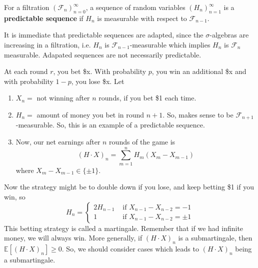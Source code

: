 	\begin{definition}
		For a filtration $(\mathscr{F}_n)_{n=0}^\infty$, a sequence of random variables $(H_n)_{n=1}^\infty$ is a \textbf{predictable sequence} if $H_n$ is measurable with respect to $\mathscr{F}_{n-1}$. 
	\end{definition}

	It is immediate that predictable sequences are adapted, since the $\sigma$-algebras are increasing in a filtration, i.e. $H_n$ is $\mathscr{F}_{n-1}$-measurable which implies $H_n$ is $\mathscr{F}_n$ measurable. Adapated sequences are not necessarily predictable. 

	\begin{example}[Gambling]
	  At each round $r$, you bet \$x. With probability $p$, you win an additional \$x and with probability $1-p$, you lose \$x. Let 
		\begin{enumerate}
		  \item $X_n = $ not winning after $n$ rounds, if you bet \$1 each time. 
			\item $H_n = $ amount of money you bet in round $n+1$. So, makes sense to be $\mathscr{F}_{n+1}$-measurable. So, this is an example of a predictable sequence. 
			\item Now, our net earnings after $n$ rounds of the game is 
				\begin{equation}
					(H \cdot X)_n = \sum_{m=1}^n H_m (X_m - X_{m-1})
				\end{equation}
				where $X_m - X_{m-1} \in \{\pm 1\}$. 
		\end{enumerate}
		Now the strategy might be to double down if you lose, and keep betting \$1 if you win, so 
		\begin{equation}
			H_n = \begin{cases} 
				2 H_{n-1} & \text{ if } X_{n-1} - X_{n-2} = -1 \\ 
				1 & \text{ if } X_{n-1} - X_{n-2} = \pm 1
			\end{cases} 
		\end{equation}
		This betting strategy is called a martingale. Remember that if we had infinite money, we will always win. More generally, if $(H \cdot X)_n$ is a submartingale, then $\mathbb{E}[(H \cdot X)_n] \geq 0$. So, we should consider cases which leads to $(H \cdot X)_n$ being a submartingale. 
	\end{example}


